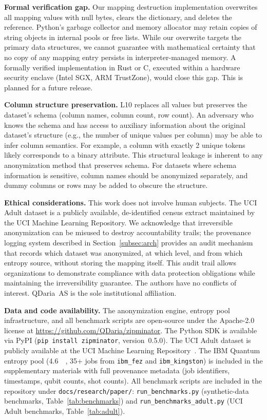 \documentclass[journal]{IEEEtran}
\begin{document}
\textbf{Formal verification gap.} Our mapping destruction implementation overwrites all mapping values with null bytes, clears the dictionary, and deletes the reference. Python's garbage collector and memory allocator may retain copies of string objects in internal pools or free lists. While our overwrite targets the primary data structures, we cannot guarantee with mathematical certainty that no copy of any mapping entry persists in interpreter-managed memory. A formally verified implementation in Rust or C, executed within a hardware security enclave (Intel SGX, ARM TrustZone), would close this gap. This is planned for a future release.

\textbf{Column structure preservation.} L10 replaces all values but preserves the dataset's schema (column names, column count, row count). An adversary who knows the schema and has access to auxiliary information about the original dataset's structure (e.g., the number of unique values per column) may be able to infer column semantics. For example, a column with exactly 2 unique tokens likely corresponds to a binary attribute. This structural leakage is inherent to any anonymization method that preserves schema. For datasets where schema information is sensitive, column names should be anonymized separately, and dummy columns or rows may be added to obscure the structure.

\textbf{Ethical considerations.} This work does not involve human subjects. The UCI Adult dataset is a publicly available, de-identified census extract maintained by the UCI Machine Learning Repository. We acknowledge that irreversible anonymization can be misused to destroy accountability trails; the provenance logging system described in Section~\ref{subsec:arch} provides an audit mechanism that records which dataset was anonymized, at which level, and from which entropy source, without storing the mapping itself. This audit trail allows organizations to demonstrate compliance with data protection obligations while maintaining the irreversibility guarantee. The authors have no conflicts of interest. QDaria~AS is the sole institutional affiliation.

\textbf{Data and code availability.} The anonymization engine, entropy pool infrastructure, and all benchmark scripts are open-source under the Apache-2.0 license at \url{https://github.com/QDaria/zipminator}. The Python SDK is available via PyPI (\texttt{pip install zipminator}, version~0.5.0). The UCI Adult dataset is publicly available at the UCI Machine Learning Repository~\cite{dua2019uci}. The IBM Quantum entropy pool (\SI{4.6}{\mega\byte}, 35+ jobs from \texttt{ibm\_fez} and \texttt{ibm\_kingston}) is included in the supplementary materials with full provenance metadata (job identifiers, timestamps, qubit counts, shot counts). All benchmark scripts are included in the repository under \texttt{docs/research/paper/}: \texttt{run\_benchmarks.py} (synthetic-data benchmarks, Table~\ref{tab:benchmarks}) and \texttt{run\_benchmarks\_adult.py} (UCI Adult benchmarks, Table~\ref{tab:adult}).
\end{document}
